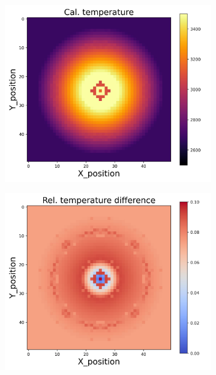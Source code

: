 \begin{figure}[htbp]
    \centering
    \begin{minipage}{\textwidth}
        \centering
        \begin{subfigure}{0.325\textwidth}
            \centering
            \includegraphics[width=\textwidth]{figures/raw_data/21/T3500/lin_square/T_cal.jpg}
        \end{subfigure}
        \begin{subfigure}{0.325\textwidth}
            \centering
            \includegraphics[width=\textwidth]{figures/raw_data/21/T3500/lin_square/T_bias.jpg}

\end{subfigure}
\end{minipage}
\end{figure}
